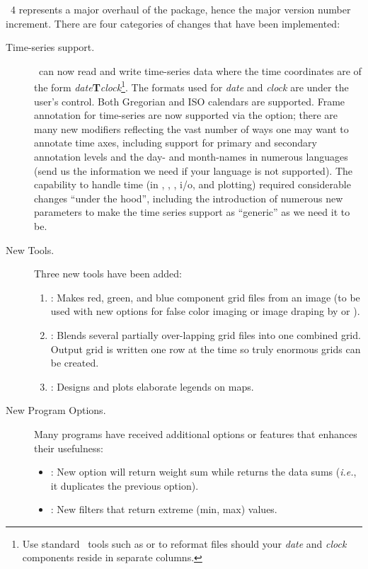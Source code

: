 \GMT\ 4 represents a major overhaul of the package, hence the major version number increment.  There are four
categories of changes that have been implemented:
\begin{description}
\item [Time-series support.]  \GMT\ can now read and write time-series data where
the time coordinates are of the form \emph{date}\textbf{T}\emph{clock}\footnote{Use standard
\UNIX\ tools such as  or  to reformat files should
your \emph{date} and \emph{clock} components reside in separate columns.}.  The formats
used for \emph{date} and \emph{clock} are under the user's control.  Both Gregorian
and ISO calendars are supported.  Frame annotation for time-series are now supported
via the  option; there are many new modifiers reflecting the vast number of
ways one may want to annotate time axes, including support for primary and secondary
annotation levels and the day- and month-names in numerous languages (send us the information
we need if your language is not supported).  The capability to handle time (in ,
, , i/o, and plotting) required considerable changes ``under the hood'',
including the introduction of numerous new  parameters to make
the time series support as ``generic'' as we need it to be.
\item [New Tools.]  Three new tools have been added:
\begin{enumerate}
\item {}: Makes red, green, and blue component grid files from an image (to be
used with new options for false color imaging or image draping by  or ).
\item {}: Blends several partially over-lapping grid files into one combined grid.  Output
grid is written one row at the time so truly enormous grids can be created.
\item {}: Designs and plots elaborate legends on maps.
\end{enumerate}
\item [New Program Options.]  Many programs have received additional options or
features that enhances their usefulness:
\begin{itemize}
\item {}:	New option  will return weight sum while  returns
the data sums (\emph{i.e.}, it duplicates the previous  option).
\item {}:	New filters  that return extreme (min, max) values.

\end{itemize}
\end{description}
